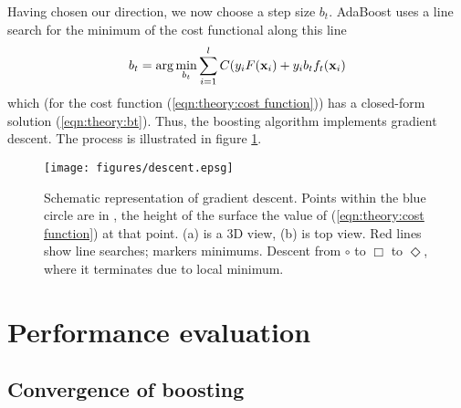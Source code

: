 Having chosen our direction, we now choose a step size $b_t$.
AdaBoost uses a line search for the minimum of the cost functional
along this line
%
\begin{equation}
b_t = \arg \min_{b_t} \sum_{i=1}^{l} C(y_i F(\mathbf{x}_i) + y_i b_t f_t(\mathbf{x}_i)
\end{equation}
%
which (for the cost function (\ref{eqn:theory:cost
function})) has a closed-form solution  (\ref{eqn:theory:bt}).  Thus, the
boosting algorithm implements gradient descent.  The process is
illustrated in figure \ref{fig:gradient descent}.

\begin{figure}
\begin{center}
\texttt{[image: figures/descent.epsg]}
\caption{Schematic representation of gradient descent.  Points within the blue
circle are in \calF, the height of the surface the value of
(\ref{eqn:theory:cost function}) at that point.  (a) is a 3D view, (b)
is top view. Red lines show line searches; markers minimums.  Descent
from $\circ$ to $\Box$ to $\Diamond$, where it terminates due to
local minimum.}
\label{fig:gradient descent}
\end{center}
\end{figure}


\section{Performance evaluation}


\subsection{Convergence of boosting}

